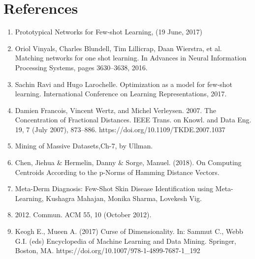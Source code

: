 \section{References}
\begin{enumerate}
\item Prototypical Networks for Few-shot Learning, (19 June, 2017)\label{1}
\item Oriol Vinyals, Charles Blundell, Tim Lillicrap, Daan Wierstra, et al. Matching networks for one shot learning. In Advances in Neural Information Processing Systems, pages 3630–3638, 2016.\label{2}
\item Sachin Ravi and Hugo Larochelle. Optimization as a model for few-shot learning. International Conference on Learning Representations, 2017.\label{3}
\item  Damien Francois, Vincent Wertz, and Michel Verleysen. 2007. The Concentration of Fractional Distances. IEEE Trans. on Knowl. and Data Eng. 19, 7 (July 2007), 873–886. https://doi.org/10.1109/TKDE.2007.1037 \label{4}
\item Mining of Massive Datasets,Ch-7, by Ullman. \label{5}
\item Chen, Jiehua & Hermelin, Danny & Sorge, Manuel. (2018). On Computing Centroids According to the p-Norms of Hamming Distance Vectors. \label{6}
\item  Meta-Derm Diagnosis: Few-Shot Skin Disease Identification using Meta-Learning, Kushagra Mahajan, Monika Sharma, Lovekesh Vig.\label{7}
\item 2012. Commun. ACM 55, 10 (October 2012).\label{8}
\item Keogh E., Mueen A. (2017) Curse of Dimensionality. In: Sammut C., Webb G.I. (eds) Encyclopedia of Machine Learning and Data Mining. Springer, Boston, MA. https://doi.org/10.1007/978-1-4899-7687-1_192\label{9}



\end{enumerate}


